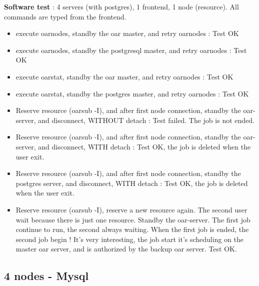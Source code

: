 \documentclass[a4paper,10pt]{report}
\begin{document}
\textbf{Software test} : 4 servers (with postgres), 1 frontend, 1 node (resource). All commands are typed from the frontend.
\begin{itemize}
 \item execute oarnodes, standby the oar master, and retry oarnodes : Test OK
 \item execute oarnodes, standby the postgresql master, and retry oarnodes : Test OK
 \item execute oarstat, standby the oar master, and retry oarnodes : Test OK
 \item execute oarstat, standby the postgres master, and retry oarnodes : Test OK
 \item Reserve resource (oarsub -I), and after first node connection, standby the oar-server, and disconnect, WITHOUT detach : Test failed. The job is not ended.
 \item Reserve resource (oarsub -I), and after first node connection, standby the oar-server, and disconnect, WITH detach : Test OK, the job is deleted when the user exit.
 \item Reserve resource (oarsub -I), and after first node connection, standby the postgres server, and disconnect, WITH detach : Test OK, the job is deleted when the user exit.
 \item Reserve resource (oarsub -I), reserve a new resource again. The second user wait because there is just one resource. Standby the oar-server. The first job continue to run, the second always waiting. When the first job is ended, the second job begin ! It's very interesting, the job start it's scheduling on the master oar server, and is authorized  by the backup oar server. Test OK.
\end{itemize}


\subsection{4 nodes - Mysql}
\end{document}
